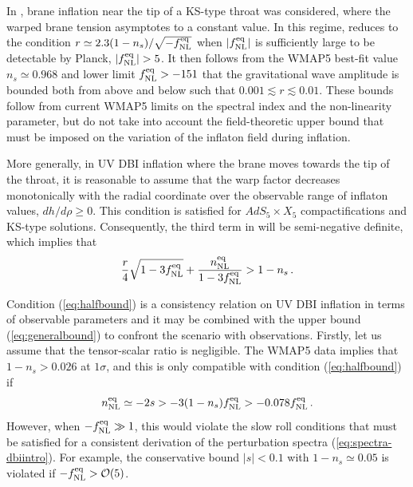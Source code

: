 In , brane inflation near the tip of a KS-type 
throat was considered, where the warped brane tension asymptotes to a 
constant value. In this regime,  reduces to 
the condition $r \simeq 2.3 (1-n_s)/\sqrt{-f_{\mathrm{NL}}^{\mathrm{eq}}}$ when $|f_{\mathrm{NL}}^{\mathrm{eq}}|$ is 
sufficiently large to be detectable by Planck, 
\iec $|f_{\mathrm{NL}}^{\mathrm{eq}}| > 5$. 
It then follows from the  
WMAP5 best-fit value $n_s \simeq 0.968$ and lower limit 
$f_{\mathrm{NL}}^{\mathrm{eq}} > -151$ \cite{Komatsu:2008hk} that the gravitational wave amplitude 
is bounded both from above and below such that $0.001 \lesssim r 
\lesssim 0.01$. These bounds follow from 
current WMAP5 limits on the spectral index and the 
non-linearity parameter, but do not take into account the 
field-theoretic upper bound that must be imposed 
on the variation of the inflaton field during inflation. 


More generally, in UV DBI inflation where the brane moves towards the 
tip of the throat, it is reasonable to assume 
that the warp factor decreases monotonically 
with the radial coordinate over the observable range of inflaton values, 
\iec $dh/d \rho \ge 0$. This condition is satisfied for  
$AdS_5 \times X_5$ compactifications and KS-type solutions. 
Consequently, the third term in 
 will be semi-negative definite, 
which implies that 
% 
\begin{equation}
\label{eq:halfbound}
\frac{r}{4} \sqrt{1-3f_{\mathrm{NL}}^{\mathrm{eq}}} + \frac{n_{\mathrm{NL}}^{\mathrm{eq}}}{1-3f_{\mathrm{NL}}^{\mathrm{eq}}} 
> 1-n_s \,.
\end{equation}
% 

Condition (\ref{eq:halfbound}) is a consistency relation on UV DBI 
inflation in terms of observable parameters and it 
may be combined with the upper bound 
(\ref{eq:generalbound}) to confront the scenario with observations.
Firstly, let us assume that the tensor-scalar ratio is negligible. 
The WMAP5 data implies that $1-n_s > 0.026$ at $1\sigma$, and this is only 
compatible with condition (\ref{eq:halfbound}) if 
% 
\begin{equation}
\label{eq:nnlbound}
n_{\mathrm{NL}}^{\mathrm{eq}} \simeq -2s > -3 (1-n_s ) f_{\mathrm{NL}}^{\mathrm{eq}} > -0.078 f_{\mathrm{NL}}^{\mathrm{eq}} \,.
\end{equation}
% 
However, when $-f_{\mathrm{NL}}^{\mathrm{eq}} \gg 1$, this would violate the slow roll conditions
that must be satisfied for a consistent 
derivation of the perturbation spectra 
(\ref{eq:spectra-dbiintro}). For example, the conservative 
bound $|s| < 0.1$ with $1-n_s \simeq 0.05$ is violated if  
$-f_{\mathrm{NL}}^{\mathrm{eq}} > {\cal{O}} (5)$. 

